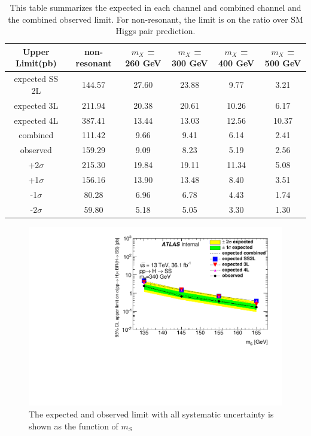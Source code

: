 \begin{table}
\scriptsize
  \centering
  \begin{tabular}{|c|c|c|c|c|c|}
  \hline
Upper Limit(pb) &non-resonant   &$m_{X}$ = 260 GeV        &$m_{X}$ = 300 GeV        &$m_{X}$ = 400 GeV        &$m_{X}$ = 500 GeV\\
\hline
expected SS 2L  &144.57 &27.60  &23.88  &9.77   &3.21   \\
\hline
expected 3L     &211.94 &20.38  &20.61  &10.26  &6.17   \\
\hline
expected 4L     &387.41 &13.44  &13.03  &12.56  &10.37  \\
\hline
combined        &111.42 &9.66   &9.41   &6.14   &2.41   \\
\hline
observed        &159.29 &9.09   &8.23   &5.19   &2.56   \\
\hline
+2$\sigma$     &215.30  &19.84  &19.11  &11.34  &5.08   \\
\hline
+1$\sigma$     &156.16  &13.90  &13.48  &8.40   &3.51   \\
\hline
-1$\sigma$     &80.28   &6.96   &6.78   &4.43   &1.74   \\
\hline
-2$\sigma$     &59.80   &5.18   &5.05   &3.30   &1.30   \\
\hline
\hline
  \end{tabular}
  \caption{This table summarizes the expected in each channel and combined channel and the combined observed limit. For non-resonant, the limit is on the ratio over SM Higgs pair prediction.}
  \label{tab:limit-comb}
\end{table}
\begin{figure}
  \centering
  \includegraphics[width=.75\textwidth,angle=-90]{fig/Statistical/combination/limit-comb-SS-AllSys-mS.pdf}
  \caption{The expected and observed limit with all systematic uncertainty is shown as the function of $m_{S}$}
  \label{fig:limit-comb-SS-mS}
\end{figure}

